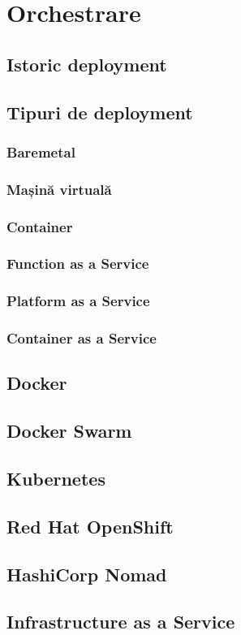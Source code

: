 \chapter{Orchestrare}
\label{orchestrare}
\section{Istoric deployment}
\section{Tipuri de deployment}
\subsection{Baremetal}
\subsection{Mașină virtuală}
\subsection{Container}
\subsection{Function as a Service}
\subsection{Platform as a Service}
\subsection{Container as a Service}
\section{Docker}
\section{Docker Swarm}
\section{Kubernetes}
\section{Red Hat OpenShift}
\section{HashiCorp Nomad}
\section{Infrastructure as a Service}
